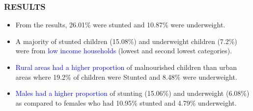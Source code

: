 \begin{frame}
	\frametitle{RESULTS}
	\begin{itemize}
		\item From the results, \alert{26.01\%} were stunted and \alert{10.87\%} were underweight. 
		\item A majority of stunted children \alert{(15.08\%)} and underweight children \alert{(7.2\%)} were from \textcolor {blue}{low income households} (lowest and second lowest categories).
		\item \textcolor {blue}{Rural areas had a higher proportion} of malnourished children than urban areas where \alert{19.2\%} of children were Stunted and \alert{8.48\%} were underweight.
		\item \textcolor {blue} {Males had a higher proportion} of stunting \alert{(15.06\%)} and underweight \alert{(6.08\%)} as compared to females who had \alert{10.95\%} stunted and \alert{4.79\%} underweight.
		\end {itemize}
	\end{frame}
